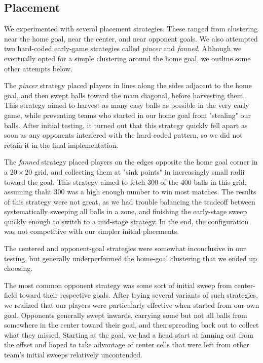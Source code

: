 \documentclass[
10pt, %
letterpaper, %
oneside, %
headinclude,footinclude, %
english
]{article}
\begin{document}
\subsection{Placement} 
We experimented with several placement strategies. These ranged from clustering near the home goal, near the center, and near opponent goals. We also attempted two hard-coded early-game strategies called \emph{pincer} and \emph{fanned}. Although we eventually opted for a simple clustering around the home goal, we outline some other attempts below.

The \emph{pincer} strategy placed players in lines along the sides adjacent to the home goal, and then swept balls toward the main diagonal, before harvesting them. This strategy aimed to harvest as many easy balls as possible in the very early game, while preventing teams who started in our home goal from "stealing" our balls. After initial testing, it turned out that this strategy quickly fell apart as soon as any opponents interfered with the hard-coded pattern, so we did not retain it in the final implementation. 

The \emph{fanned} strategy placed players on the edges opposite the home goal corner in a $20 \times 20$ grid, and collecting them at "sink points" in increasingly small radii toward the goal. This strategy aimed to fetch 300 of the 400 balls in this grid, assuming thaht 300 was a high enough number to win most matches. The results of this strategy were not great, as we had trouble balancing the tradeoff between systematically sweeping all balls in a zone, and finishing the early-stage sweep quickly enough to switch to a mid-stage strategy. In the end, the configuration was not competitive with our simpler initial placements.

The centered and opponent-goal strategies were somewhat inconclusive in our testing, but generally underperformed the home-goal clustering that we ended up choosing.

The most common opponent strategy was some sort of initial sweep from center-field toward their respective goals. After trying several variants of such strategies, we realized that our players were particularly effective when started from our own goal. Opponents generally swept inwards, carrying some but not all balls from somewhere in the center toward their goal, and then spreading back out to collect what they missed. Starting at the goal, we had a head start at fanning out from the offset and hoped to take advantage of center cells that were left from other team's initial sweeps relatively uncontended.
\end{document}
